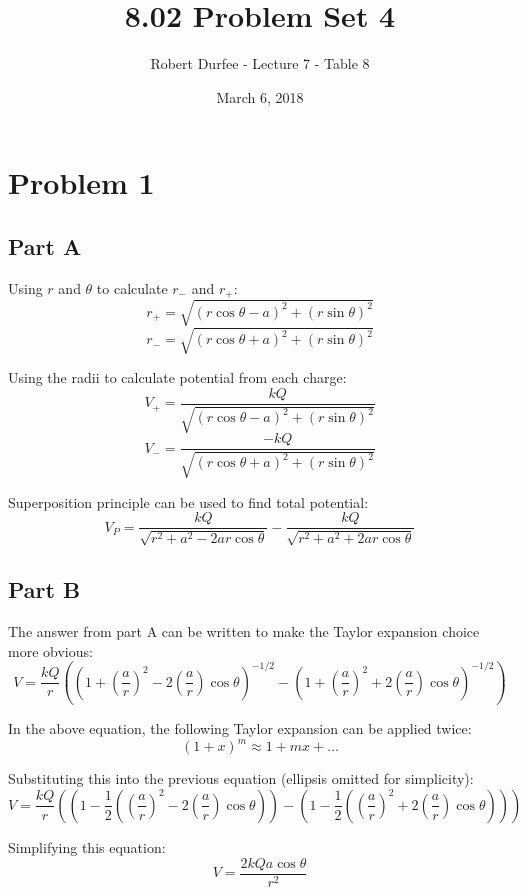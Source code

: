 \documentclass{article}
\title{ 8.02 Problem Set 4 }
\author{ Robert Durfee - Lecture 7 - Table 8 }
\date{ March 6, 2018 }
\begin{document}
\maketitle

\section{ Problem 1 }

\subsection*{Part A}

Using $r$ and $\theta$ to calculate $r_{-}$ and $r_{+}$:
$$ r_{+} = \sqrt{(r \cos \theta - a)^{2} + (r \sin \theta)^{2}} $$
$$ r_{-} = \sqrt{(r \cos \theta + a)^{2} + (r \sin \theta)^{2}} $$

Using the radii to calculate potential from each charge:
$$ V_{+} = \frac{ k Q }{ \sqrt{(r \cos \theta - a)^{2} + (r \sin \theta)^{2}} } $$
$$ V_{-} = \frac{ -k Q }{ \sqrt{(r \cos \theta + a)^{2} + (r \sin \theta)^{2}} } $$

Superposition principle can be used to find total potential:
$$ V_{P} = \frac{ k Q }{ \sqrt{r^{2} + a^{2} - 2ar\cos\theta} }
- \frac{ k Q }{ \sqrt{r^{2} + a^{2} + 2ar\cos\theta} }$$

\subsection*{Part B}

The answer from part A can be written to make the Taylor expansion choice more
obvious:
$$ V = \frac{ kQ }{ r } \left( \left( 1 + \left( \frac{ a }{ r }
\right)^{2} - 2 \left( \frac{ a }{ r } \right) \cos \theta \right)^{-1/2}
- \left( 1 + \left( \frac{ a }{ r } \right)^{2} + 2 \left( \frac{ a }{ r
} \right) \cos \theta  \right)^{-1/2}\right) $$

In the above equation, the following Taylor expansion can be applied twice:
$$ (1 + x)^{m} \approx 1 + mx + \ldots $$

Substituting this into the previous equation (ellipsis omitted for simplicity):
$$ V = \frac{ kQ }{ r } \left( \left( 1 - \frac{ 1 }{ 2 } \left( \left(
\frac{ a }{ r } \right)^{2} - 2 \left( \frac{ a }{ r } \right) \cos \theta
\right) \right) - \left( 1 - \frac{ 1 }{ 2 } \left( \left( \frac{ a }{ r}
\right)^{2} + 2 \left( \frac{ a }{ r } \right) \cos \theta \right) \right)
\right) $$

Simplifying this equation:
$$ V = \frac{ 2kQa \cos \theta }{ r^{2} } $$
\end{document}
